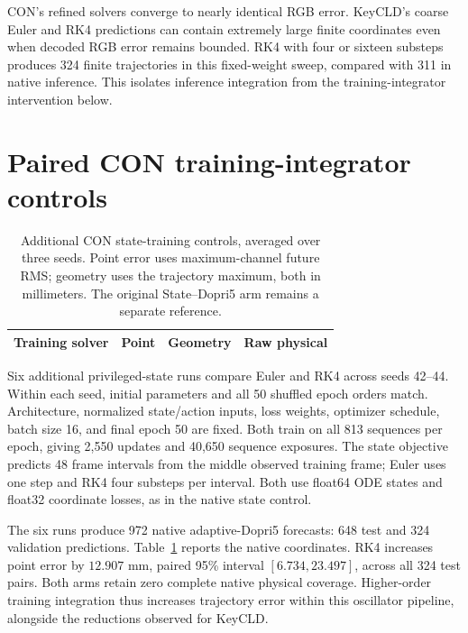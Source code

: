 \documentclass[10pt,twocolumn,letterpaper]{article}
\begin{document}
CON's refined solvers converge to nearly identical RGB error. KeyCLD's coarse Euler and RK4 predictions can contain extremely large finite coordinates even when decoded RGB error remains bounded. RK4 with four or sixteen substeps produces 324 finite trajectories in this fixed-weight sweep, compared with 311 in native inference. This isolates inference integration from the training-integrator intervention below.

\section{Paired CON training-integrator controls}
\label{app:con-integrators}

\begin{table}[!t]
\caption{Additional CON state-training controls, averaged over three seeds. Point error uses maximum-channel future RMS; geometry uses the trajectory maximum, both in millimeters. The original State--Dopri5 arm remains a separate reference.}
\label{app:con-integrator-table}
\centering\small
\begin{tabular}{lrrr}
\toprule
Training solver & Point & Geometry & Raw physical\\
\midrule

\bottomrule
\end{tabular}
\end{table}
Six additional privileged-state runs compare Euler and RK4 across seeds 42--44. Within each seed, initial parameters and all 50 shuffled epoch orders match. Architecture, normalized state/action inputs, loss weights, optimizer schedule, batch size 16, and final epoch 50 are fixed. Both train on all 813 sequences per epoch, giving 2,550 updates and 40,650 sequence exposures. The state objective predicts 48 frame intervals from the middle observed training frame; Euler uses one step and RK4 four substeps per interval. Both use float64 ODE states and float32 coordinate losses, as in the native state control.

The six runs produce 972 native adaptive-Dopri5 forecasts: 648 test and 324 validation predictions. Table~\ref{app:con-integrator-table} reports the native coordinates. RK4 increases point error by $12.907$ mm, paired 95\% interval $[6.734,23.497]$, across all 324 test pairs. Both arms retain zero complete native physical coverage. Higher-order training integration thus increases trajectory error within this oscillator pipeline, alongside the reductions observed for KeyCLD.
\end{document}
